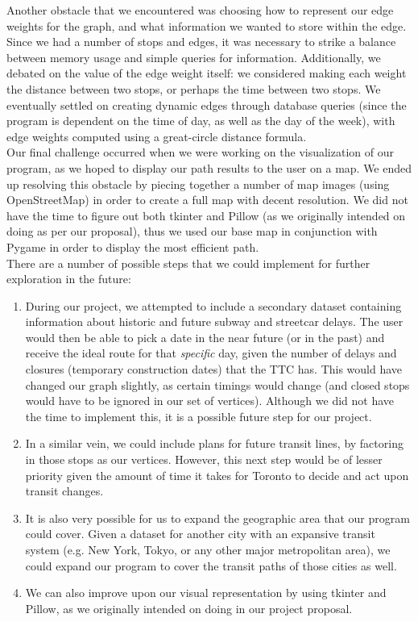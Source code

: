 \documentclass[fontsize=11pt]{article}
\begin{document}
    Another obstacle that we encountered was choosing how to represent our edge weights for the graph, and what information we wanted to store within the edge. Since we had a number of stops and edges, it was necessary to strike a balance between memory usage and simple queries for information. Additionally, we debated on the value of the edge weight itself: we considered making each weight the distance between two stops, or perhaps the time between two stops. We eventually settled on creating dynamic edges through database queries (since the program is dependent on the time of day, as well as the day of the week), with edge weights computed using a great-circle distance formula. \\

    Our final challenge occurred when we were working on the visualization of our program, as we hoped to display our path results to the user on a map. We ended up resolving this obstacle by piecing together a number of map images (using OpenStreetMap) in order to create a full map with decent resolution. We did not have the time to figure out both tkinter and Pillow (as we originally intended on doing as per our proposal), thus we used our base map in conjunction with Pygame in order to display the most efficient path. \\

    There are a number of possible steps that we could implement for further exploration in the future:
    \begin{enumerate}
        \item During our project, we attempted to include a secondary dataset containing information about historic and future subway and streetcar delays. The user would then be able to pick a date in the near future (or in the past) and receive the ideal route for that \emph{specific} day, given the number of delays and closures (temporary construction dates) that the TTC has. This would have changed our graph slightly, as certain timings would change (and closed stops would have to be ignored in our set of vertices). Although we did not have the time to implement this, it is a possible future step for our project.
        \item In a similar vein, we could include plans for future transit lines, by factoring in those stops as our vertices. However, this next step would be of lesser priority given the amount of time it takes for Toronto to decide and act upon transit changes.
        \item It is also very possible for us to expand the geographic area that our program could cover. Given a dataset for another city with an expansive transit system (e.g. New York, Tokyo, or any other major metropolitan area), we could expand our program to cover the transit paths of those cities as well.
        \item We can also improve upon our visual representation by using tkinter and Pillow, as we originally intended on doing in our project proposal.
    \end{enumerate}
\end{document}
